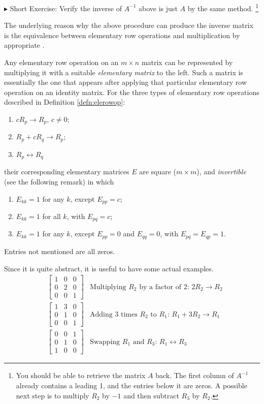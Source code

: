 $\blacktriangleright$ Short Exercise: Verify the inverse of $A^{-1}$ above is just $A$ by the same method. \footnote{You should be able to retrieve the matrix $A$ back. The first column of $A^{-1}$ already contains a leading 1, and the entries below it are zeros. A possible next step is to multiply $R_2$ by $-1$ and then subtract $R_3$ by $R_2$.}\par
The underlying reason why the above procedure can produce the inverse matrix is the equivalence between elementary row operations and multiplication by appropriate .
\begin{defn}
\label{defn:elementarymat}
Any elementary row operation on an $m \times n$ matrix can be represented by multiplying it with a suitable \textit{elementary matrix} to the left. Such a matrix is essentially the one that appears after applying that particular elementary row operation on an identity matrix. For the three types of elementary row operations described in Definition \ref{defn:elerowop}:
\begin{enumerate}
\item $cR_{p} \to R_{p}$, $c \neq 0$;
\item $R_{p} + cR_{q} \to R_{p}$;
\item $R_{p} \leftrightarrow R_{q}$
\end{enumerate}
their corresponding elementary matrices $E$ are square ($m \times m$), and \textit{invertible} (see the following remark) in which
\begin{enumerate}
\item $E_{kk} = 1$ for any $k$, except $E_{pp} = c$;
\item $E_{kk} = 1$ for all $k$, with $E_{pq} = c$;
\item $E_{kk} = 1$ for any $k$, except $E_{pp} = 0$ and $E_{qq} = 0$, with $E_{pq} = E_{qp} = 1$. 
\end{enumerate}
Entries not mentioned are all zeros.
\end{defn}
Since it is quite abstract, it is useful to have some actual examples.
\begin{align*}
&
\begin{bmatrix}
1 & 0 & 0 \\
0 & 2 & 0 \\
0 & 0 & 1
\end{bmatrix} & \text{Multiplying $R_2$ by a factor of $2$: } 2R_2 \to R_2 \\
&
\begin{bmatrix}
1 & 3 & 0 \\
0 & 1 & 0 \\
0 & 0 & 1
\end{bmatrix} & \text{Adding 3 times $R_2$ to $R_1$: } R_1 + 3R_2 \to R_1 \\
&
\begin{bmatrix}
0 & 0 & 1 \\
0 & 1 & 0 \\
1 & 0 & 0
\end{bmatrix} & \text{Swapping $R_1$ and $R_3$: } R_1 \leftrightarrow R_3 
\end{align*}
